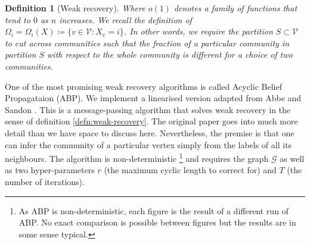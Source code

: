 \documentclass[]{article}
\newcommand{\Gcal}{\mathcal{G}}
\newcommand{\Vcal}{\mathcal{V}}
\newtheorem{definition}{Definition}[section]
\begin{document}
\begin{multicols*}{2}
\begin{definition}[Weak recovery]
	Where $o(1)$ denotes a family of functions that tend to $0$ as $n$ increases. We recall the definition of $\Omega_i = \Omega_i(X) \coloneqq \{v \in \Vcal : X_v = i\}$. In other words, we require the partition $S \subset \Vcal$ to cut across communities such that the fraction of a particular community in partition $S$ with respect to the whole community is different for a choice of two communities.  
\end{definition}

One of the most promising weak recovery algorithms is called Acyclic Belief Propagataion (ABP). We implement a linearised version adapted from Abbe and Sandon \cite{Linear-ABP}. This is a message-passing algorithm that solves weak recovery in the sense of definition \ref{defn:weak-recovery}. The original paper goes into much more detail than we have space to discuss here. Nevertheless, the premise is that one can infer the community of a particular vertex simply from the labels of all its neighbours. The algorithm is non-deterministic
\footnote{As ABP is non-deterministic, each figure is the result of a different run of ABP. No exact comparison is possible between figures but the results are in some sense typical.}
and requires the graph $\Gcal$ as well as two hyper-parameters $r$ (the maximum cyclic length to correct for) and $T$ (the number of iterations).


\end{multicols*}
\end{document}
